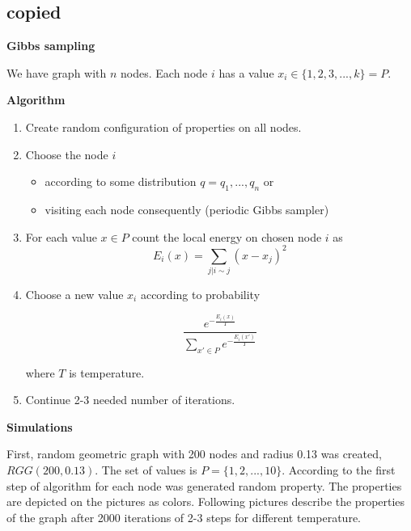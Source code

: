 \documentclass[12pt]{report}
\begin{document}
\subsection{copied}
\textbf{Gibbs sampling} 

We have graph with $n$ nodes. Each node $i$ has a value $x_i \in \lbrace 1, 2, 3, ..., k \rbrace = P$. 


\textbf{Algorithm} 

\begin{enumerate}
  \item Create random configuration of properties on all nodes.
  \item Choose the node $i$
  
 	 \begin{itemize}
		\item according to some distribution $q = q_1, ..., q_n$ or
		\item visiting each node consequently (periodic Gibbs sampler)
 	 \end{itemize}
  
  \item For each value $x \in P$ count the local energy on chosen node $i$ as 
  $$ E_i(x) = \sum\limits_{j | i \sim j}  (x - x_j)^2 $$  
  
  \item Choose a new value $x_i$ according to probability
  
  $$ \frac{ e^{-\frac{E_i(x)}{T}} }{ \sum\limits_{x'\in P} e^{-\frac{E_i(x')}{T}}} $$
  
	where $T$ is temperature.
\item Continue 2-3 needed number of iterations.
\end{enumerate}


\textbf{Simulations}

First, random geometric graph with 200 nodes and radius 0.13 was created, $RGG(200, 0.13)$. The set of values is $P = \lbrace 1, 2, ..., 10 \rbrace$. According to the first step of algorithm for each node was generated random property. The properties are depicted on the pictures as colors. Following pictures describe the properties of the graph after 2000 iterations of 2-3 steps for different temperature.
\end{document}
